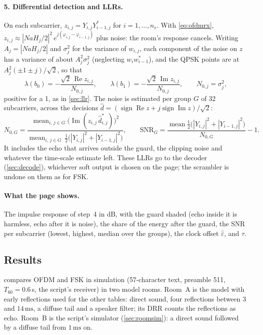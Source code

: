 \documentclass[11pt,a4paper]{article}
\newcommand{\ms}{\,\mathrm{ms}}
\theoremstyle{remark}
\begin{document}
\paragraph{5. Differential detection and LLRs.}
On each subcarrier, $z_{i,j} = Y_{i,j} Y_{i-1,j}^{*}$ for $i = 1, \dots, n_s$. With \cref{eq:ofdmrx}, $z_{i,j} \approx |N a H_j/2|^2\, e^{j(\varphi_{i,j} - \varphi_{i-1,j})}$ plus noise: the room's response cancels. Writing $A_j = |N a H_j/2|$ and $\sigma_j^2$ for the variance of $w_{i,j}$, each component of the noise on $z$ has a variance of about $A_j^2 \sigma_j^2$ (neglecting $w_i w_{i-1}^*$), and the QPSK points are at $A_j^2(\pm 1 \pm j)/\sqrt2$, so that
\begin{equation}
\lambda(b_0) = -\frac{\sqrt2\, \operatorname{Re} z_{i,j}}{N_{0,j}}, \qquad \lambda(b_1) = -\frac{\sqrt2\, \operatorname{Im} z_{i,j}}{N_{0,j}}, \qquad N_{0,j} = \sigma_j^2,
\end{equation}
positive for a 1, as in \cref{sec:llr}. The noise is estimated per group $G$ of 32 subcarriers, across the decisions $\hat d = (\operatorname{sign}\operatorname{Re} z + j \operatorname{sign}\operatorname{Im} z)/\sqrt2$:
\begin{equation}
N_{0,G} = \frac{\operatorname{mean}_{i,\, j \in G} \bigl(\operatorname{Im}(z_{i,j}\, \hat d_{i,j}^{*})\bigr)^2}{\operatorname{mean}_{i,\, j \in G}\, \tfrac12\bigl(|Y_{i,j}|^2 + |Y_{i-1,j}|^2\bigr)},
\qquad \mathrm{SNR}_G = \frac{\operatorname{mean} \tfrac12\bigl(|Y_{i,j}|^2 + |Y_{i-1,j}|^2\bigr)}{N_{0,G}} - 1.
\end{equation}
It includes the echo that arrives outside the guard, the clipping noise and whatever the time-scale estimate left. These LLRs go to the decoder (\cref{sec:decode}), whichever soft output is chosen on the page; the scrambler is undone on them as for FSK.

\paragraph{What the page shows.}
\label{sec:ofdmshow}
The impulse response of step~4 in dB, with the guard shaded (echo inside it is harmless, echo after it is noise), the share of the energy after the guard, the SNR per subcarrier (lowest, highest, median over the groups), the clock offset $\hat\varepsilon$, and $\tau$.

\subsection{Results}
\label{sec:ofdmres}
 compares OFDM and FSK in simulation (57-character text, preamble 511, $T_{60} = 0.6$\,s, the script's receiver) in two model rooms. Room~A is the model with early reflections used for the other tables: direct sound, four reflections between 3 and $14\ms$, a diffuse tail and a speaker filter; its DRR counts the reflections as echo. Room~B is the script's simulator (\cref{sec:roomsim}): a direct sound followed by a diffuse tail from $1\ms$ on.
\end{document}

